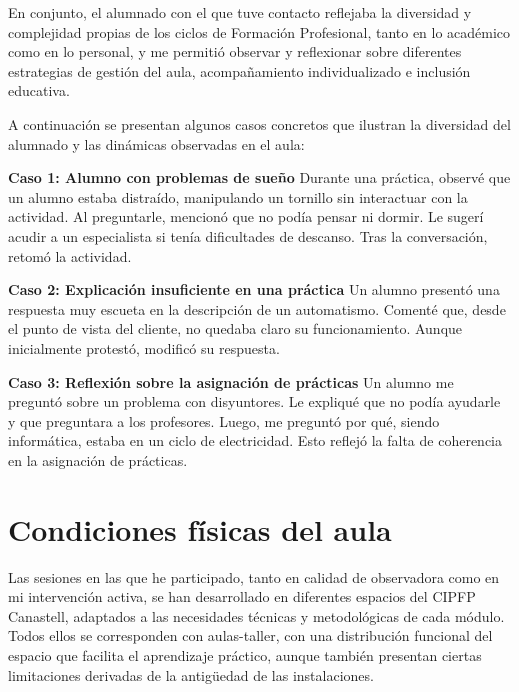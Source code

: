 En conjunto, el alumnado con el que tuve contacto reflejaba la diversidad y complejidad propias de los ciclos de Formación Profesional, tanto en lo académico como en lo personal, y me permitió observar y reflexionar sobre diferentes estrategias de gestión del aula, acompañamiento individualizado e inclusión educativa.

A continuación se presentan algunos casos concretos que ilustran la diversidad del alumnado y las dinámicas observadas en el aula:

\textbf{Caso 1: Alumno con problemas de sueño}  
Durante una práctica, observé que un alumno estaba distraído, manipulando un tornillo sin interactuar con la actividad. Al preguntarle, mencionó que no podía pensar ni dormir. Le sugerí acudir a un especialista si tenía dificultades de descanso. Tras la conversación, retomó la actividad.

\textbf{Caso 2: Explicación insuficiente en una práctica}  
Un alumno presentó una respuesta muy escueta en la descripción de un automatismo. Comenté que, desde el punto de vista del cliente, no quedaba claro su funcionamiento. Aunque inicialmente protestó, modificó su respuesta.

\textbf{Caso 3: Reflexión sobre la asignación de prácticas}  
Un alumno me preguntó sobre un problema con disyuntores. Le expliqué que no podía ayudarle y que preguntara a los profesores. Luego, me preguntó por qué, siendo informática, estaba en un ciclo de electricidad. Esto reflejó la falta de coherencia en la asignación de prácticas.



\section{Condiciones físicas del aula}

Las sesiones en las que he participado, tanto en calidad de observadora como en mi intervención activa, se han desarrollado en diferentes espacios del CIPFP Canastell, adaptados a las necesidades técnicas y metodológicas de cada módulo. Todos ellos se corresponden con aulas-taller, con una distribución funcional del espacio que facilita el aprendizaje práctico, aunque también presentan ciertas limitaciones derivadas de la antigüedad de las instalaciones.

